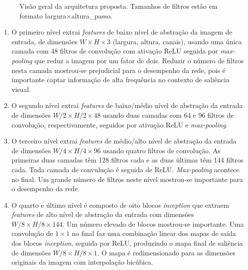 \documentclass[11pt]{article}
\newcommand{\tit}[1]{\textit{#1}}
\begin{document}
\begin{figure}[H]
    \centering
    \def\svgwidth{0.9\columnwidth}
    
    \label{fig:model}
    \caption{Visão geral da arquitetura proposta.
        Tamanhos de filtros estão em formato
        largura$\times$altura\_passo.}
\end{figure}

\begin{enumerate}
    \item O primeiro nível extrai \tit{features} de baixo nível de abstração
        da imagem de entrada, de dimensões
        $W\times H \times 3$ (largura, altura, canais), usando uma única
        camada com 48 filtros de convolução com ativação ReLU seguida por
        \tit{max-pooling} que reduz a imagem por um fator de dois.
        Reduzir o número de filtros nesta camada mostrou-se prejudicial para
        o desempenho da rede, pois é importante captar informação de
        alta frequência no contexto de saliência visual.
    \item O segundo nível extrai \tit{features} de baixo/médio nível de
        abstração da entrada de dimensões $W/2 \times H/2 \times 48$
        usando duas camadas com 64 e 96 filtros de convolução, respectivamente,
        seguidos por ativação ReLU e \tit{max-pooling}.
    \item O terceiro nível extrai \tit{features} de médio/alto nível de
        abstração da entrada de dimensões $W/4 \times H/4 \times 96$ usando
        quatro filtros de convolução.
        As primeiras duas camadas têm 128 filtros cada e as duas últimas
        têm 144 filtros cada. Toda camada de convulução é seguida de ReLU.
        \tit{Max-pooling} acontece no final.
        Um grande número de filtros neste nível mostrou-se importante para
        o desempenho da rede.
    \item O quarto e último nível é composto de oito blocos \tit{inception}
        que extraem \tit{features} de alto nível de abstração da entrada
        com dimensões $W/8 \times H/8 \times 144$.
        Um número elevado de blocos mostrou-se importante.
        Uma convolução de $1 \times 1$ no final faz uma combinação linear
        dos mapas de saída dos blocos \tit{inception}, seguida por ReLU,
        produzindo o mapa final de saliência de dimensões
        $W/8 \times H/8 \times 1$.
        O mapa é redimensionado para as dimensões originais da imagem
        com interpolação bicúbica.
\end{enumerate}
\end{document}
